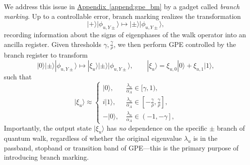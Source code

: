 \documentclass[letterpaper,onecolumn,11pt,accepted=2026-02-14]{quantumarticle}
\theoremstyle{remark}
\theoremstyle{plain}
\newcommand{\append}[1]{\hyperref[append:#1]{Appendix~\ref*{append:#1}}}
\newcommand{\ket}[1]{|#1\rangle}
\begin{document}
We address this issue in \append{gpe_bm} by a gadget called \emph{branch marking}. Up to a controllable error, branch marking realizes the transformation
\begin{equation}
    \ket{+}\ket{\phi_{u,Y\pm}}\mapsto\ket{\pm}\ket{\phi_{u,Y\pm}},
\end{equation}
recording information about the signs of eigenphases of the walk operator into an ancilla register. Given thresholds $\gamma,\frac{\gamma}{\rho}$, we then perform GPE controlled by the branch register to transform
\begin{equation}
    \ket{0}\ket{\pm}\ket{\phi_{u,Y\pm}}\mapsto\ket{\xi_{u}}\ket{\pm}\ket{\phi_{u,Y\pm}},\qquad
    \ket{\xi_{u}}=\xi_{u,0}\ket{0}+\xi_{u,1}\ket{1},
\end{equation}
such that
\begin{equation}
    \ket{\xi_u}\approx
\begin{cases}
    \ket{0},\quad&\frac{\lambda_u}{\alpha_A}\in[\gamma,1),\\
    i\ket{1},&\frac{\lambda_u}{\alpha_A}\in\left[-\frac{\gamma}{\rho},\frac{\gamma}{\rho}\right],\\
    -\ket{0},&\frac{\lambda_u}{\alpha_A}\in\left(-1,-\gamma\right],
\end{cases}
\end{equation}
Importantly, the output state $\ket{\xi_u}$ has \emph{no} dependence on the specific $\pm$ branch of quantum walk, regardless of whether the original eigenvalue $\lambda_u$ is in the passband, stopband or transition band of GPE---this is the primary purpose of introducing branch marking.
\end{document}
